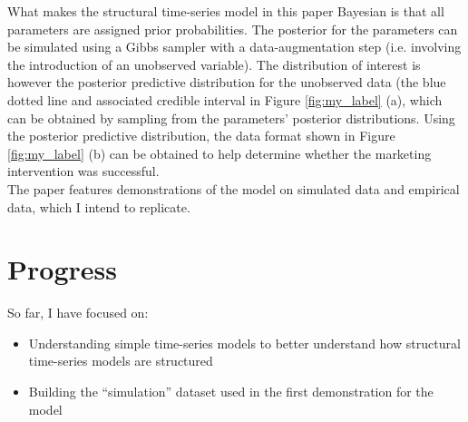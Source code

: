 \documentclass[12pt]{article}
\begin{document}
What makes the structural time-series model in this paper Bayesian is that all parameters are assigned prior probabilities. The posterior for the parameters can be simulated using a Gibbs sampler with a data-augmentation step (i.e. involving the introduction of an unobserved variable). The distribution of interest is however the posterior predictive distribution for the unobserved data (the blue dotted line and associated credible interval in Figure \ref{fig:my_label} (a), which can be obtained by sampling from the parameters' posterior distributions. Using the posterior predictive distribution, the data format shown in Figure \ref{fig:my_label} (b) can be obtained to help determine whether the marketing intervention was successful.\\

The paper features demonstrations of the model on simulated data and empirical data, which I intend to replicate.
\section{Progress}
So far, I have focused on:\\

\begin{itemize}
    \item Understanding simple time-series models to better understand how structural time-series models are structured
    \item Building the ``simulation'' dataset used in the first demonstration for the model
\end{itemize}
\end{document}
